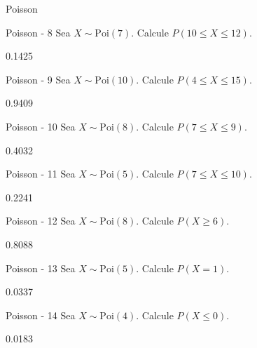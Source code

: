 \documentclass[a4,11pt]{aleph-notas}
\newcommand{\Poi}{\text{Poi}}
\begin{document}
\begin{quiz}{Poisson}
\begin{numerical}[tolerance=0.001]%
    {Poisson - 8}
    Sea \( X \sim \Poi(7) \). Calcule \( P(10 \leq X \leq 12) \).
    \item[] 0.1425
\end{numerical}

\begin{numerical}[tolerance=0.001]%
    {Poisson - 9}
    Sea \( X \sim \Poi(10) \). Calcule \( P(4 \leq X \leq 15) \).
    \item[] 0.9409
\end{numerical}

\begin{numerical}[tolerance=0.001]%
    {Poisson - 10}
    Sea \( X \sim \Poi(8) \). Calcule \( P(7 \leq X \leq 9) \).
    \item[] 0.4032
\end{numerical}

\begin{numerical}[tolerance=0.001]%
    {Poisson - 11}
    Sea \( X \sim \Poi(5) \). Calcule \( P(7 \leq X \leq 10) \).
    \item[] 0.2241
\end{numerical}

\begin{numerical}[tolerance=0.001]%
    {Poisson - 12}
    Sea \( X \sim \Poi(8) \). Calcule \( P(X \geq 6) \).
    \item[] 0.8088
\end{numerical}

\begin{numerical}[tolerance=0.001]%
    {Poisson - 13}
    Sea \( X \sim \Poi(5) \). Calcule \( P(X = 1) \).
    \item[] 0.0337
\end{numerical}

\begin{numerical}[tolerance=0.001]%
    {Poisson - 14}
    Sea \( X \sim \Poi(4) \). Calcule \( P(X \leq 0) \).
    \item[] 0.0183
\end{numerical}


\end{quiz}
\end{document}
